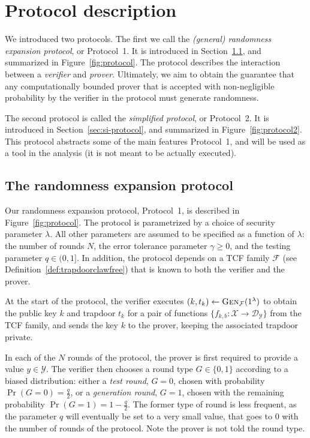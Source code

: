 \documentclass[11pt]{article}
\theoremstyle{remark}
\theoremstyle{definition}
\newcommand{\mD}{\ensuremath{\mathcal{D}}}
\newcommand{\mF}{\ensuremath{\mathcal{F}}}
\newcommand{\mX}{\ensuremath{\mathcal{X}}}
\newcommand{\mY}{\ensuremath{\mathcal{Y}}}
\newcommand{\Gen}{\textsc{Gen}}
\begin{document}


\section{Protocol description}
\label{sec:protocol}

We introduced two protocols. The first we call the \emph{(general) randomness expansion protocol}, or Protocol~1. It is introduced in Section~\ref{sec:re-protocol}, and summarized in Figure~\ref{fig:protocol}. The protocol describes the interaction between a \emph{verifier} and \emph{prover}. Ultimately, we aim to obtain the guarantee that any computationally bounded prover that is accepted with non-negligible probability by the verifier in the protocol must generate randomness. 

The second protocol is called the \emph{simplified protocol}, or Protocol~2. It is introduced in Section~\ref{sec:si-protocol}, and summarized in Figure~\ref{fig:protocol2}. This protocol abstracts some of the main features Protocol~1, and will be used as a tool in the analysis (it is not meant to be actually executed).  


\subsection{The randomness expansion protocol}
\label{sec:re-protocol}

Our randomness expansion protocol, Protocol~1, is described in Figure~\ref{fig:protocol}. The protocol is parametrized by a choice of security parameter $\lambda$. All other parameters are assumed to be specified as a function of $\lambda$: the number of rounds $N$, the error tolerance parameter $\gamma \geq 0$, and the testing parameter $q\in (0,1]$. In addition, the protocol depends on a TCF family $\mathcal{F}$ (see Definition~\ref{def:trapdoorclawfree}) that is known to both the verifier and the prover.

At the start of the protocol, the verifier executes $(k,t_k)\leftarrow \Gen_\mF(1^\lambda)$ to obtain the public key $k$ and trapdoor $t_k$ for a pair of functions $\{f_{k,b}:\mX\to \mD_\mY\}$ from the TCF family, and sends the key $k$ to the prover, keeping the associated trapdoor private. 

In each of the $N$ rounds of the protocol, the prover is first required to provide a value $y\in\mY$. The verifier then chooses a round type $G\in\{0,1\}$ according to a biased distribution: either a \emph{test round}, $G=0$, chosen with probability $\Pr(G=0)=\frac{q}{2}$, or a \emph{generation round}, $G=1$, chosen with the remaining probability $\Pr(G=1)=1-\frac{q}{2}$. The former type of round is less frequent, as the parameter $q$ will eventually be set to a very small value, that goes to $0$ with the number of rounds of the protocol. Note the prover is not told the round type. 
\end{document}
